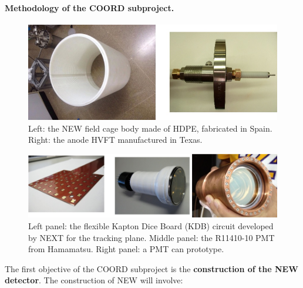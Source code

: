 \paragraph{Methodology of the COORD subproject.}


\begin{figure}[t!b!]
\begin{center}
\includegraphics[width=.9\textwidth]{img/FC3.jpg}
\end{center}
\caption{\small Left: the NEW field cage body made of HDPE, fabricated in Spain. Right: the anode HVFT manufactured in Texas.
} \label{fig:FC}
\end{figure}

\begin{figure}[t!b!]
\begin{center}
\includegraphics[width=.9\textwidth]{img/KDBandPMT.jpg}
\end{center}
\caption{\small Left panel: the flexible Kapton Dice Board (KDB) circuit developed by NEXT for the tracking plane. Middle panel: the R11410-10 PMT from Hamamatsu. Right panel: a PMT can prototype.} \label{fig:sensors}
\end{figure}

The first objective of the COORD subproject is the {\bf construction of the NEW detector}. The construction of NEW will involve:

